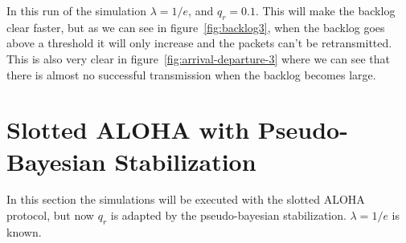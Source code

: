 \documentclass{article}
\begin{document}
In this run of the simulation $\lambda=1/e$, and $q_r=0.1$. This will make the backlog clear faster, but as we can see in figure~\ref{fig:backlog3}, when the backlog goes above a threshold it will only increase and the packets can't be retransmitted. This is also very clear in figure~\ref{fig:arrival-departure-3} where we can see that there is almost no successful transmission when the backlog becomes large.

\section{Slotted ALOHA with Pseudo-Bayesian Stabilization}

In this section the simulations will be executed with the slotted ALOHA protocol, but now $q_r$ is adapted by the pseudo-bayesian stabilization. $\lambda=1/e$ is known.
\end{document}

